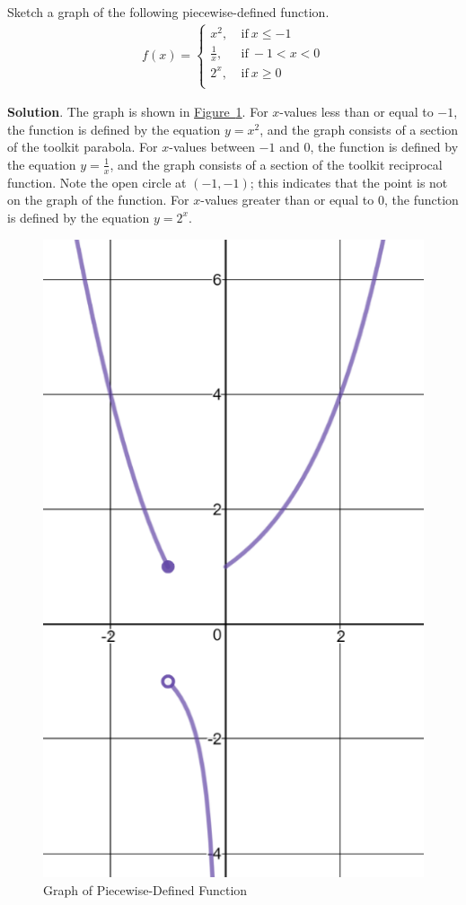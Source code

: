\documentclass[10pt,]{book}
\theoremstyle{ptxdefinitionnotitle}
\theoremstyle{ptxdefinitiontitle}
\numberwithin{equation}{section}
\newcommand{\lt}{<}
\newcommand{\amp}{&}
\begin{document}
\begin{example}\label{example-4}
\hypertarget{p-54}{}%
Sketch a graph of the following piecewise-defined function.%
%
\begin{align*}
f(x) =
\begin{cases}
x^2, \amp  \ \text{if}  \ x \leq -1 \\
\frac{1}{x}, \amp  \ \text{if}  \ -1 \lt x \lt 0 \\
2^x, \amp  \ \text{if}  \ x \geq 0 \\
\end{cases}
\end{align*}
\par\smallskip%
\noindent\textbf{Solution}.\hypertarget{solution-2}{}\quad%
\hypertarget{p-55}{}%
The graph is shown in \hyperref[chapter02-section02-piecewise-soln]{Figure~\ref{chapter02-section02-piecewise-soln}}.  For \(x\)-values less than or equal to \(-1\), the function is defined by the equation \(y = x^2\), and the graph consists of a section of the toolkit parabola.  For \(x\)-values between \(-1\) and \(0\), the function is defined by the equation \(y = \frac{1}{x}\), and the graph consists of a section of the toolkit reciprocal function.  Note the open circle at \(\left( -1, -1 \right)\); this indicates that the point is not on the graph of the function. For \(x\)-values greater than or equal to \(0\), the function is defined by the equation \(y = 2^x\).%
\begin{figure}
\centering
\includegraphics[width=0.5\linewidth]{./src/images/chapter02/chapter02-section02-piecewise-soln.png}
\caption{Graph of Piecewise-Defined Function\label{chapter02-section02-piecewise-soln}}
\end{figure}
\end{example}
\typeout{************************************************}
\typeout{************************************************}
\end{document}
